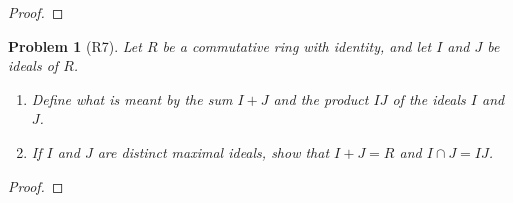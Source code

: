 \documentclass[10pt]{article}
\newcommand{\sk}{\vskip 10mm}
\theoremstyle{plain}
\newtheorem{problem}{Problem}
\theoremstyle{remark}
\begin{document}
\begin{proof}
  
\end{proof}

\sk


\begin{problem}[R7]
  Let $R$ be a commutative ring with identity, and let $I$ and $J$ be ideals
  of $R$.
  \begin{enumerate}
  \item Define what is meant by the sum $I+J$ and the product $IJ$ of
    the ideals $I$ and $J$.
  \item If $I$ and $J$ are distinct maximal ideals, show that $I+J=R$ and
    $I\cap J=IJ$.
  \end{enumerate}
\end{problem}

\begin{proof}
  
\end{proof}

\end{document}
